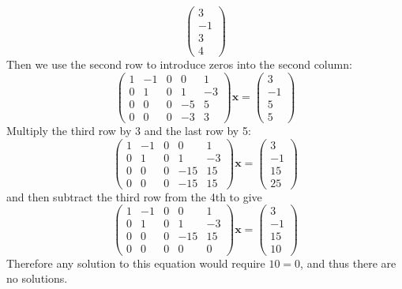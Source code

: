 \documentclass{article}
\newcommand{\chapternumber}{2}
\newenvironment{QandA}{\begin{enumerate}[label=\chapternumber.\arabic*]\bfseries\boldmath}
	{\end{enumerate}}
\newenvironment{answered}{\par\bigskip\normalfont\unboldmath}{}
\begin{document}
\begin{QandA}
\begin{answered}
\[			\begin{pmatrix}
				3\\
				-1\\
				3\\
				4
			\end{pmatrix}
			\]
			Then we use the second row to introduce zeros into the second column:
			\[\begin{pmatrix}
				1 & -1 & 0 & 0 & 1 \\
				0 & 1 & 0 & 1 & -3 \\
				0 & 0 & 0 & -5 & 5 \\
				0 & 0 & 0 & -3 & 3
			\end{pmatrix}
			\textbf{x}=
			\begin{pmatrix}
				3\\
				-1\\
				5\\
				5
			\end{pmatrix}
			\]
			Multiply the third row by 3 and the last row by 5:
			\[\begin{pmatrix}
				1 & -1 & 0 & 0 & 1 \\
				0 & 1 & 0 & 1 & -3 \\
				0 & 0 & 0 & -15 & 15 \\
				0 & 0 & 0 & -15 & 15
			\end{pmatrix}
			\textbf{x}=
			\begin{pmatrix}
				3\\
				-1\\
				15\\
				25
			\end{pmatrix}
			\]
			and then subtract the third row from the 4th to give
						\[\begin{pmatrix}
				1 & -1 & 0 & 0 & 1 \\
				0 & 1 & 0 & 1 & -3 \\
				0 & 0 & 0 & -15 & 15 \\
				0 & 0 & 0 & 0 & 0
			\end{pmatrix}
			\textbf{x}=
			\begin{pmatrix}
				3\\
				-1\\
				15\\
				10
			\end{pmatrix}
			\]
			Therefore any solution to this equation would require $10=0$, and thus there are no solutions.
		\end{answered}
		

\end{QandA}
\end{document}

